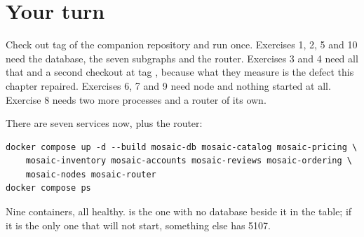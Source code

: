 \section*{Your turn}

Check out tag  of the companion repository and run 
once. Exercises 1, 2, 5 and 10 need the database, the seven subgraphs and the
router. Exercises 3 and 4 need all that and a second checkout at tag ,
because what they measure is the defect this chapter repaired. Exercises 6, 7 and
9 need node and nothing started at all. Exercise 8 needs two more processes and a
router of its own.

There are seven services now, plus the router:

\begin{verbatim}
docker compose up -d --build mosaic-db mosaic-catalog mosaic-pricing \
    mosaic-inventory mosaic-accounts mosaic-reviews mosaic-ordering \
    mosaic-nodes mosaic-router
docker compose ps
\end{verbatim}

Nine containers, all healthy.  is the one with no database
beside it in the table; if it is the only one that will not start, something else
has 5107.

